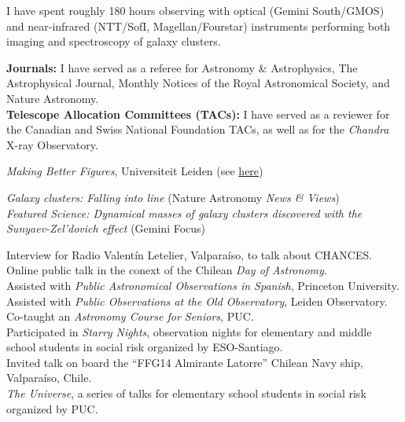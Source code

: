 \documentclass[11pt]{article}
\begin{document}
{I have spent roughly 180 hours observing with 
optical (Gemini South/GMOS) and near-infrared (NTT/SofI, Magellan/Fourstar) instruments performing both 
imaging and spectroscopy of galaxy clusters.}


%


\noindent 
\textbf{Journals:} I have served as a referee for Astronomy \& Astrophysics, The 
    Astrophysical Journal, Monthly Notices of the Royal
    Astronomical Society, and Nature Astronomy.\\
\noindent
\textbf{Telescope Allocation Committees (TACs):} I have served as a reviewer for 
    the Canadian and Swiss National Foundation TACs, as well as for the 
    \textit{Chandra} X-ray Observatory.


\noindent
{} \emph{Making Better Figures}, Universiteit Leiden
(see \href{https://home.strw.leidenuniv.nl/~kenworthy/teaching/better_figures/}{here})


\noindent
{} \emph{Galaxy clusters: Falling into line} (Nature Astronomy \emph{News \& Views})\\
 \emph{Featured Science: Dynamical masses of galaxy clusters discovered with the Sunyaev-Zel'dovich effect} (Gemini Focus)


\noindent
{} Interview for Radio Valent\'in Letelier, Valparaíso, to talk about CHANCES.\\
 Online public talk in the conext of the Chilean \textit{Day of Astronomy}.\\
 Assisted with \emph{Public Astronomical Observations in Spanish}, Princeton University.\\
 Assisted with \emph{Public Observations at the Old Observatory}, Leiden Observatory.\\
 Co-taught an \emph{Astronomy Course for Seniors}, PUC.\\
 Participated in \emph{Starry Nights}, observation nights for 
elementary and middle school students in social risk organized by ESO-Santiago.\\
 Invited talk on board the ``FFG14 Almirante Latorre'' Chilean Navy ship, Valpara\'iso, Chile.\\
 \emph{The Universe}, a series of talks for elementary school students in social risk organized by PUC.\\
\end{document}
